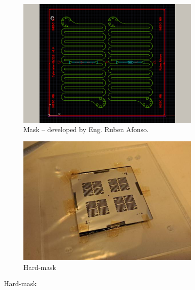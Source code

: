 \begin{figure}[!ht]
    \centering
    \begin{subfigure}[b]{.475\linewidth}
        \centering
        \includegraphics[width=\linewidth]{images/appendix_b/mask.png}
        \caption{Mask -- developed by Eng. Ruben Afonso.}
        \label{figure:pdms-mask}
    \end{subfigure}
    \hfill
    \centering
    \begin{subfigure}[b]{.475\linewidth}
        \centering
        \includegraphics[width=\linewidth]{images/appendix_b/hardmask.png}
        \caption{Hard-mask}
        \label{figure:pdms-hardmask}
    \end{subfigure}

    \bigskip
    

\end{figure}
